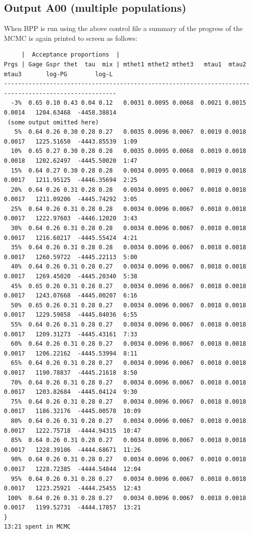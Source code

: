 \documentclass[a4paper]{book}
\numberwithin{equation}{section} \renewcommand{\baselinestretch}{0.55}
\begin{document}
\newpage
\subsection{Output A00 (multiple populations)}
When BPP is run using the above control file a summary of the progress of the
MCMC is again printed to screen as follows:
{ \scriptsize
\begin{verbatim}
     |  Acceptance proportions  |
Prgs | Gage Gspr thet  tau  mix | mthet1 mthet2 mthet3   mtau1  mtau2  mtau3       log-PG        log-L
------------------------------------------------------------------------------------------------------
  -3%  0.65 0.10 0.43 0.04 0.12   0.0031 0.0095 0.0068  0.0021 0.0015 0.0014   1204.63468  -4458.38814
 (some output omitted here)
   5%  0.64 0.26 0.30 0.28 0.27   0.0035 0.0096 0.0067  0.0019 0.0018 0.0017   1225.51650  -4443.85539  1:09
  10%  0.65 0.27 0.30 0.28 0.28   0.0035 0.0095 0.0068  0.0019 0.0018 0.0018   1202.62497  -4445.50020  1:47
  15%  0.64 0.27 0.30 0.28 0.28   0.0034 0.0095 0.0068  0.0019 0.0018 0.0017   1211.95125  -4446.35694  2:25
  20%  0.64 0.26 0.31 0.28 0.28   0.0034 0.0095 0.0067  0.0018 0.0018 0.0017   1211.09206  -4445.74292  3:05
  25%  0.64 0.26 0.31 0.28 0.28   0.0034 0.0096 0.0067  0.0018 0.0018 0.0017   1222.97603  -4446.12020  3:43
  30%  0.64 0.26 0.31 0.28 0.28   0.0034 0.0096 0.0067  0.0018 0.0018 0.0017   1216.60217  -4445.55424  4:21
  35%  0.64 0.26 0.31 0.28 0.28   0.0034 0.0096 0.0067  0.0018 0.0018 0.0017   1260.59722  -4445.22113  5:00
  40%  0.64 0.26 0.31 0.28 0.27   0.0034 0.0096 0.0067  0.0018 0.0018 0.0017   1269.45020  -4445.20340  5:38
  45%  0.65 0.26 0.31 0.28 0.27   0.0034 0.0096 0.0067  0.0018 0.0018 0.0017   1243.07668  -4445.00207  6:16
  50%  0.65 0.26 0.31 0.28 0.27   0.0034 0.0096 0.0067  0.0018 0.0018 0.0017   1229.59858  -4445.04036  6:55
  55%  0.64 0.26 0.31 0.28 0.27   0.0034 0.0096 0.0067  0.0018 0.0018 0.0017   1209.31273  -4445.43161  7:33
  60%  0.64 0.26 0.31 0.28 0.27   0.0034 0.0096 0.0067  0.0018 0.0018 0.0017   1206.22162  -4445.53994  8:11
  65%  0.64 0.26 0.31 0.28 0.27   0.0034 0.0096 0.0067  0.0018 0.0018 0.0017   1190.78837  -4445.21618  8:50
  70%  0.64 0.26 0.31 0.28 0.27   0.0034 0.0096 0.0067  0.0018 0.0018 0.0017   1203.82684  -4445.04124  9:30
  75%  0.64 0.26 0.31 0.28 0.27   0.0034 0.0096 0.0067  0.0018 0.0018 0.0017   1186.32176  -4445.00578  10:09
  80%  0.64 0.26 0.31 0.28 0.27   0.0034 0.0096 0.0067  0.0018 0.0018 0.0017   1222.75718  -4444.94315  10:47
  85%  0.64 0.26 0.31 0.28 0.27   0.0034 0.0096 0.0067  0.0018 0.0018 0.0017   1228.39106  -4444.68671  11:26
  90%  0.64 0.26 0.31 0.28 0.27   0.0034 0.0096 0.0067  0.0018 0.0018 0.0017   1228.72385  -4444.54844  12:04
  95%  0.64 0.26 0.31 0.28 0.27   0.0034 0.0096 0.0067  0.0018 0.0018 0.0017   1223.25921  -4444.25455  12:43
 100%  0.64 0.26 0.31 0.28 0.27   0.0034 0.0096 0.0067  0.0018 0.0018 0.0017   1199.52731  -4444.17857  13:21
}
13:21 spent in MCMC


\end{verbatim}}
\end{document}
